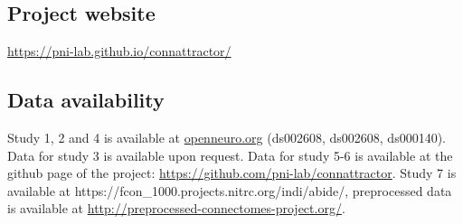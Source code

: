 \documentclass{article}
\begin{document}
\subsection{Project website}

\href{https://pni-lab.github.io/connattractor/}{https://pni-lab.github.io/connattractor/}

\subsection{Data availability}

Study 1, 2 and 4 is available at \href{http://openneuro.org}{openneuro.org} (ds002608, ds002608, ds000140). Data for study 3 is available upon request. Data for study 5-6 is available at the github page of the project: \href{https://github.com/pni-lab/connattractor}{https://github.com/pni-lab/connattractor}. Study 7 is available at https://fcon\_1000.projects.nitrc.org/indi/abide/, preprocessed data is available at \href{http://preprocessed-connectomes-project.org/}{http://preprocessed-connectomes-project.org/}.
\printglossaries





\end{document}
